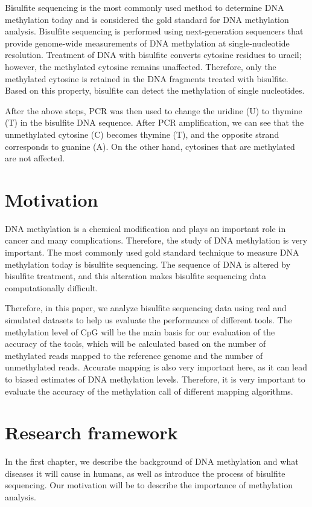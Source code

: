 \documentclass{PHlab-thesis}
\begin{document}
Bisulfite sequencing is the most commonly used method to determine DNA methylation today and is considered the gold standard for DNA methylation analysis. Bisulfite sequencing is performed using next-generation sequencers that provide genome-wide measurements of DNA methylation at single-nucleotide resolution. Treatment of DNA with bisulfite converts cytosine residues to uracil; however, the methylated cytosine remains unaffected. Therefore, only the methylated cytosine is retained in the DNA fragments treated with bisulfite. Based on this property, bisulfite can detect the methylation of single nucleotides.

After the above steps, PCR was then used to change the uridine (U) to thymine (T) in the bisulfite DNA sequence. After PCR amplification, we can see that the unmethylated cytosine (C) becomes thymine (T), and the opposite strand corresponds to guanine (A). On the other hand, cytosines that are methylated are not affected.

\section{Motivation}
DNA methylation is a chemical modification and plays an important role in cancer and many complications. Therefore, the study of DNA methylation is very important. The most commonly used gold standard technique to measure DNA methylation today is bisulfite sequencing. The sequence of DNA is altered by bisulfite treatment, and this alteration makes bisulfite sequencing data computationally difficult.

Therefore, in this paper, we analyze bisulfite sequencing data using real and simulated datasets to help us evaluate the performance of different tools. The methylation level of CpG will be the main basis for our evaluation of the accuracy of the tools, which will be calculated based on the number of methylated reads mapped to the reference genome and the number of unmethylated reads. Accurate mapping is also very important here, as it can lead to biased estimates of DNA methylation levels. Therefore, it is very important to evaluate the accuracy of the methylation call of different mapping algorithms.

\section{Research framework}
In the first chapter, we describe the background of DNA methylation and what diseases it will cause in humans, as well as introduce the process of bisulfite sequencing. Our motivation will be to describe the importance of methylation analysis.
\end{document}

